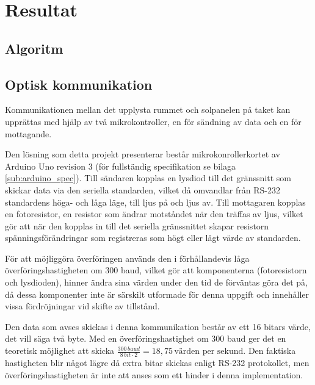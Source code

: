 \section{Resultat} %
\label{sec:resultat}
    \subsection{Algoritm} %
    \label{sub:algoritm}

    \subsection{Optisk kommunikation} %
    \label{sub:optisk_kommunikation}

        Kommunikationen mellan det upplysta rummet och solpanelen på taket kan upprättas med hjälp av två mikrokontroller, en för sändning av data och en för mottagande.\bigskip

        Den lösning som detta projekt presenterar består mikrokonrollerkortet av Arduino Uno revision 3 (för fullständig specifikation se bilaga \ref{sub:arduino_spec}).\cite{ardu} Till sändaren kopplas en lysdiod till det gränssnitt som skickar data via den seriella standarden, vilket då omvandlar från RS-232 standardens höga- och låga läge, till ljus på och ljus av. Till mottagaren kopplas en fotoresistor, en resistor som ändrar motståndet när den träffas av ljus, vilket gör att när den kopplas in till det seriella gränssnittet skapar resistorn spänningsförändringar som registreras som högt eller lågt värde av standarden. \bigskip

        För att möjliggöra överföringen används den i förhållandevis låga överföringshastigheten om 300 baud, vilket gör att komponenterna (fotoresistorn och lysdioden), hinner ändra sina värden under den tid de förväntas göra det på, då dessa komponenter inte är särskilt utformade för denna uppgift och innehåller vissa fördröjningar vid skifte av tillstånd. \bigskip

        Den data som avses skickas i denna kommunikation består av ett 16 bitars värde, det vill säga två byte. Med en överföringshastighet om 300 baud ger det en teoretisk möjlighet att skicka $\frac{300 \,\textit{baud}}{8 \, bit \cdot 2} = 18,75 \, \text{värden per sekund}$. Den faktiska hastigheten blir något lägre då extra bitar skickas enligt RS-232 protokollet, men överföringshastigheten är inte att anses som ett hinder i denna implementation.


    
